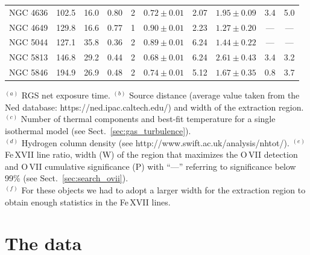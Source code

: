 \documentclass[useAMS,usenatbib]{mn2e}
\begin{document}
\begin{table}
{\begin{tabular}{c c c c c c c c c c}
{{NGC 4636}}           &   102.5    &   16.0      &    0.80         &  2    & $ 0.72 \pm 0.01$ & 2.07  & $1.95  \pm 0.09 $ &   3.4   & 5.0        \\     %
{{NGC 4649}}           &   129.8    &   16.6      &    0.77         &  1    & $ 0.90 \pm 0.01$ & 2.23  & $1.27  \pm 0.20 $ &   ---   & ---        \\      %
{{NGC 5044}}           &   127.1    &   35.8      &    0.36         &  2    & $ 0.89 \pm 0.01$ & 6.24  & $1.44  \pm 0.22 $ &   ---   & ---        \\     %
{{NGC 5813}}           &   146.8    &   29.2      &    0.44         &  2    & $ 0.68 \pm 0.01$ & 6.24  & $2.61  \pm 0.43 $ &   3.4   & 3.2        \\     %
{{NGC 5846}}           &   194.9    &   26.9      &    0.48         &  2    & $ 0.74 \pm 0.01$ & 5.12  & $1.67  \pm 0.35 $ &   0.8   & 3.7        \\     %
\hline                
\end{tabular}}

$^{(a)}$ RGS net exposure time. 
$^{(b)}$ Source distance (average value taken from the Ned database: https://ned.ipac.caltech.edu/) and width of the extraction region. 
$^{(c)}$ Number of thermal components and best-fit temperature for a single isothermal model (see Sect.~\ref{sec:gas_turbulence}). \\
$^{(d)}$ Hydrogen column density (see http://www.swift.ac.uk/analysis/nhtot/).
$^{(e)}$ Fe\,{\small XVII} line ratio, width (W) of the region that maximizes the O\,{\small VII} detection and O\,{\small VII} cumulative significance (P)
with ``---'' referring to significance below 99\% (see Sect.~\ref{sec:search_ovii}).\\
$^{(f)}$ For these objects we had to adopt a larger width for the extraction region
to obtain enough statistics in the Fe\,{\small XVII} lines.
\end{table}
 
\section[]{The data}
\label{sec:data}
\end{document}
